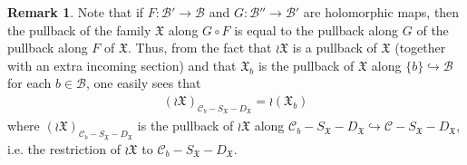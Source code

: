 \documentclass[11pt,b5paper,notitlepage]{article}
\theoremstyle{definition}
\newtheorem{rem}[df]{Remark}
\theoremstyle{plain}
\newcommand{\fk}{\mathfrak}
\newcommand{\mc}{\mathcal}
\newcommand{\SX}{{S_{\fk X}}}
\newcommand{\DX}{D_{\fk X}}
\newcommand{\<}{\left\langle}
\renewcommand{\>}{\right\rangle}
\newcommand{\MC}{\mathcal{C}}
\newcommand{\MB}{\mathcal{B}}
\newcommand{\fx}{\mathfrak{X}}
\numberwithin{equation}{section}
\begin{document}
\begin{comment}
The fiber of the propagated family $\wr\fx$ is described as follows. Let $c\in \wr\MB=\MC-S_\fx-D_\fx$ and $b=\pi(c)$. Then it is easy to see that
$$
(\wr\fx)_c=\Big(\tau_1(b),\cdots,\tau_M(b);\theta_1|_{\mc C_b},\dots,\theta_M|_{\mc C_b}\Big|\MC_b\Big|c,\varsigma_1(b),\cdots,\varsigma_N(b)\Big),
$$
On the other hand, applying Def. \ref{propagatedfamily} to the data $\fk X_b$, we have
\begin{align}
\wr(\fx_b)=\Big(&\wr(\tau_1(b)),\cdots,\wr(\tau_M(b));\wr(\theta_1|_{\mc C_b}),\dots,\wr(\theta_M|_{\mc C_b})\Big|   \nonumber\\
&\wr\pi':\MC_b\times \big(\MC_b-S_\fx(b)-D_\fx(b)\big)\rightarrow \MC_b-S_\fx(b)-D_\fx(b)\Big|\sigma_b,\wr(\varsigma_1(b)),\cdots,\wr(\varsigma_N(b))\Big)  \label{eq51}
\end{align}
\end{comment}


\begin{rem}\label{fiberpropagation}
Note that if $F:\mc B'\rightarrow\mc B$ and $G:\mc B''\rightarrow\mc B'$ are holomorphic maps, then the pullback of the family $\fk X$ along $G\circ F$ is equal to the pullback along $G$ of the pullback along $F$ of $\fk X$. Thus, from the fact that $\wr\fk X$ is a pullback of $\fk X$ (together with an extra incoming section) and that $\fk X_b$ is the pullback of $\fk X$ along $\{b\}\hookrightarrow \mc B$ for each $b\in\mc B$, one easily sees that
\begin{align}
(\wr\fk X)_{\mc C_b-\SX-\DX}=\wr(\fx_b)  \label{eq58}
\end{align}
where $(\wr\fk X)_{\mc C_b-\SX-\DX}$ is the pullback of $\wr\fk X$ along $\mc C_b-\SX-\DX\hookrightarrow\mc C-\SX-\DX$, i.e. the restriction of $\wr\fk X$ to $\mc C_b-\SX-\DX$.
\end{rem}
\end{document}
